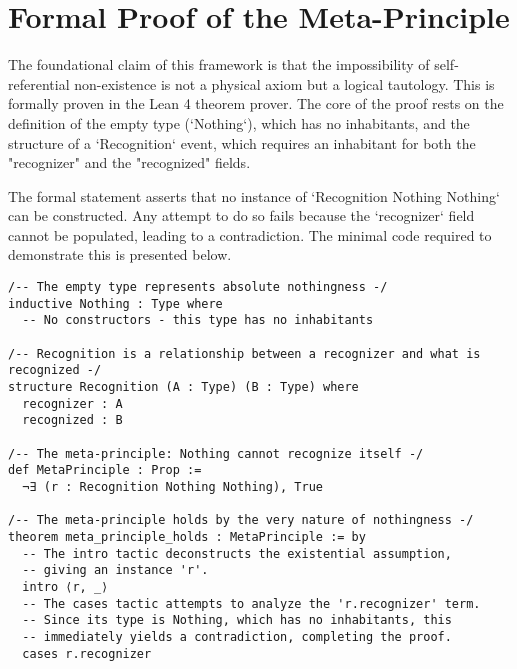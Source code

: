 \documentclass[axioms,article,submit,pdftex,oneauthor]{Definitions/mdpi}
\begin{document}
\appendix
\section{Formal Proof of the Meta-Principle}
\label{app:meta_principle_proof}

The foundational claim of this framework is that the impossibility of self-referential non-existence is not a physical axiom but a logical tautology. This is formally proven in the Lean 4 theorem prover. The core of the proof rests on the definition of the empty type (`Nothing`), which has no inhabitants, and the structure of a `Recognition` event, which requires an inhabitant for both the "recognizer" and the "recognized" fields.

The formal statement asserts that no instance of `Recognition Nothing Nothing` can be constructed. Any attempt to do so fails because the `recognizer` field cannot be populated, leading to a contradiction. The minimal code required to demonstrate this is presented below.
\begin{lstlisting}[language=Lean, caption={Formal Proof of the Meta-Principle in Lean 4}, 
breaklines=true, breakatwhitespace=true, basicstyle=\small\ttfamily]
/-- The empty type represents absolute nothingness -/
inductive Nothing : Type where
  -- No constructors - this type has no inhabitants

/-- Recognition is a relationship between a recognizer and what is recognized -/
structure Recognition (A : Type) (B : Type) where
  recognizer : A
  recognized : B

/-- The meta-principle: Nothing cannot recognize itself -/
def MetaPrinciple : Prop :=
  ¬∃ (r : Recognition Nothing Nothing), True

/-- The meta-principle holds by the very nature of nothingness -/
theorem meta_principle_holds : MetaPrinciple := by
  -- The intro tactic deconstructs the existential assumption, 
  -- giving an instance 'r'.
  intro ⟨r, _⟩
  -- The cases tactic attempts to analyze the 'r.recognizer' term.
  -- Since its type is Nothing, which has no inhabitants, this 
  -- immediately yields a contradiction, completing the proof.
  cases r.recognizer
\end{lstlisting}

\printbibliography


\end{document}
